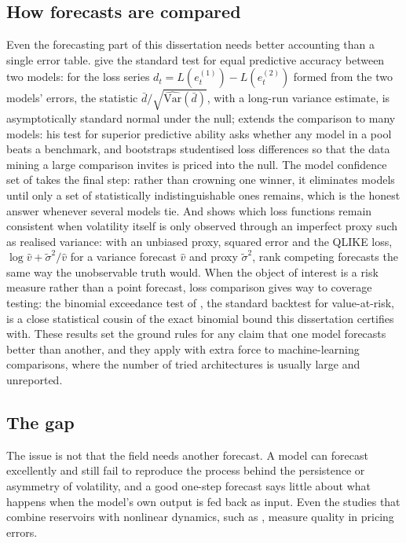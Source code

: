 \documentclass[12pt,a4paper]{article}
\begin{document}
\subsection{How forecasts are compared}

Even the forecasting part of this dissertation needs better accounting
than a single error table. \citet{dieboldmariano1995} give the standard
test for equal predictive accuracy between two models: for the loss
series $d_t = L(e_t^{(1)}) - L(e_t^{(2)})$ formed from the two models'
errors, the statistic $\bar d / \sqrt{\widehat{\mathrm{Var}}(\bar d)}$,
with a long-run variance estimate, is asymptotically standard normal
under the null;
\citet{hansen2005} extends the comparison to many models: his test for
superior predictive ability asks whether any model in a pool beats a
benchmark, and bootstraps studentised loss differences so that the data
mining a large comparison invites is priced into the null. The model
confidence set of \citet{hansenlundenason2011} takes the final step:
rather than crowning one winner, it eliminates models until only a set
of statistically indistinguishable ones remains, which is the honest
answer whenever several models tie. And
\citet{patton2011} shows which loss functions remain consistent when
volatility itself is only observed through an imperfect proxy such as
realised variance: with an unbiased proxy, squared error and the QLIKE
loss, $\log \hat v + \tilde\sigma^2 / \hat v$ for a variance forecast
$\hat v$ and proxy $\tilde\sigma^2$, rank competing forecasts the same
way the unobservable truth would. When the object of interest is a risk
measure rather than a point forecast, loss comparison gives way to
coverage testing: the binomial exceedance test of \citet{kupiec1995},
the standard backtest for value-at-risk, is a close statistical cousin
of the exact binomial bound this dissertation certifies with. These
results set the ground rules for any claim that
one model forecasts better than another, and they apply with extra force
to machine-learning comparisons, where the number of tried architectures
is usually large and unreported.

\subsection{The gap}

The issue is not that the field needs another forecast. A model can
forecast excellently and still fail to reproduce the process behind the
persistence or asymmetry of volatility, and a good one-step forecast says
little about what happens when the model's own output is fed back as
input. Even the studies that combine reservoirs with nonlinear dynamics,
such as \citet{dossantos2025}, measure quality in pricing errors.
\end{document}
